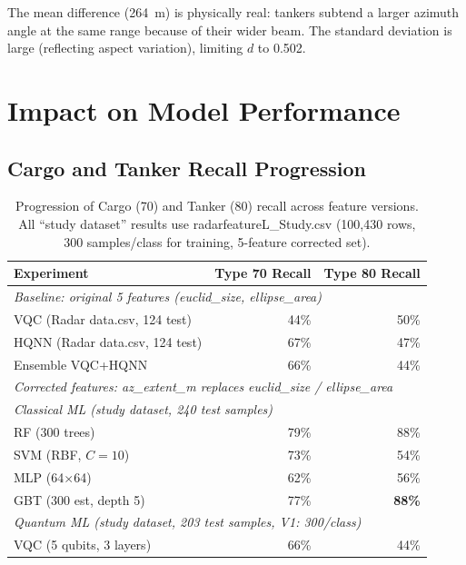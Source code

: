 \documentclass[journal]{IEEEtran}
\begin{document}
The mean difference (264~m) is physically real: tankers subtend a larger
azimuth angle at the same range because of their wider beam.
The standard deviation is large (reflecting aspect variation),
limiting $d$ to 0.502.

\section{Impact on Model Performance}
\label{sec:impact}

\subsection{Cargo and Tanker Recall Progression}

\begin{table}[H]
\centering
\caption{Progression of Cargo (70) and Tanker (80) recall across feature versions.
         All ``study dataset'' results use radarfeatureL\_Study.csv
         (100,430 rows, 300 samples/class for training, 5-feature corrected set).}
\label{tab:recall_progression}
\begin{tabular}{p{7.5cm}rr}
\toprule
\textbf{Experiment} & \textbf{Type 70 Recall} & \textbf{Type 80 Recall} \\
\midrule
\multicolumn{3}{l}{\textit{Baseline: original 5 features (euclid\_size, ellipse\_area)}} \\
VQC (Radar data.csv, 124 test)    & 44\% & 50\% \\
HQNN (Radar data.csv, 124 test)   & 67\% & 47\% \\
Ensemble VQC+HQNN                 & 66\% & 44\% \\
\midrule
\multicolumn{3}{l}{\textit{Corrected features: az\_extent\_m replaces euclid\_size / ellipse\_area}} \\
\multicolumn{3}{l}{\quad\textit{Classical ML (study dataset, 240 test samples)}} \\
RF  (300 trees)                   & 79\% & 88\% \\
SVM (RBF, $C=10$)                 & 73\% & 54\% \\
MLP (64$\times$64)                & 62\% & 56\% \\
GBT (300 est, depth 5)            & 77\% & \textbf{88\%} \\
\multicolumn{3}{l}{\quad\textit{Quantum ML (study dataset, 203 test samples, V1: 300/class)}} \\
VQC  (5 qubits, 3 layers)         & 66\% & 44\% \\

\end{tabular}
\end{table}
\end{document}
